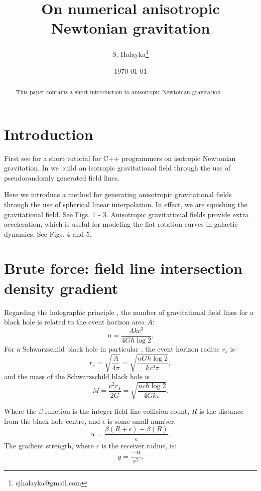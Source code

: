 \documentclass[12pt]{article}
\title{On numerical anisotropic Newtonian gravitation}
\author{S. Halayka\footnote{sjhalayka@gmail.com}}
\date{\today\;\currenttime}
\begin{document}
 
\maketitle

\begin{abstract}
This paper contains a short introduction to anisotropic Newtonian gravitation.
\end{abstract}



\section{Introduction}

First see \cite{halayka} for a short tutorial for C++ programmers on isotropic Newtonian gravitation.
In \cite{halayka} we build an isotropic gravitational field through the use of pseudorandomly generated field lines.

Here we introduce a method for generating anisotropic gravitational fields through the use of spherical linear interpolation.
In effect, we are squishing the gravitational field.
See Figs. 1 - 3.
Anisotropic gravitational fields provide extra acceleration, which is useful for modeling the flat rotation curves in galactic dynamics.
See Figs. 4 and 5.




\section{Brute force: field line intersection density gradient}

Regarding the holographic principle \cite{hooft, susskind}, the number of gravitational field lines for a black hole is related to the event horizon area $A$:
\begin{equation}
n = \frac{A k c^3}{ 4 G \hbar \log 2}.
\end{equation}
For a Schwarzschild black hole in particular \cite{misner}, the event horizon radius $r_s$ is
\begin{equation}
r_s = \sqrt{\frac{A}{4 \pi}} = \sqrt{\frac{n G \hbar \log 2}{k c^3 \pi}},
\end{equation}
and the mass of the Schwarzschild black hole is
\begin{equation}
M = \frac{c^2 r_s}{2 G} = \sqrt{\frac{n c \hbar \log 2}{4 G k \pi}}.
\end{equation}

Where the $\beta$ function is the integer field line collision count, $R$ is the distance from the black hole centre, and $\epsilon$ is some small number:
\begin{equation}
\alpha = \frac{\beta(R + \epsilon) - \beta(R)}{\epsilon}.
\end{equation}
The gradient strength, where $r$ is the receiver radius, is:
\begin{equation}
g = \frac{-\alpha}{r^2}. 
\end{equation}
\end{document}
